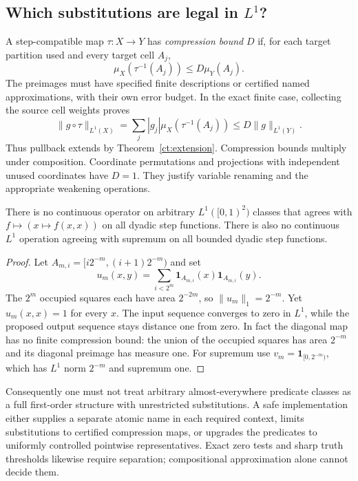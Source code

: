 \subsection{Which substitutions are legal in \texorpdfstring{$L^1$}{L1}?}

A step-compatible map $\tau:X\to Y$ has \emph{compression bound} $D$ if,
for each target partition used and every target cell $A_j$,
\[
                \mu_X(\tau^{-1}(A_j))\leq D\mu_Y(A_j).
\]
The preimages must have specified finite descriptions or certified named
approximations, with their own error budget. In the exact finite case,
collecting the source cell weights proves
\[
 \|g\circ\tau\|_{L^1(X)}
 =\sum_j|g_j|\mu_X(\tau^{-1}(A_j))
 \leq D\|g\|_{L^1(Y)}.
\]
Thus pullback extends by Theorem~\ref{ct:extension}. Compression bounds
multiply under composition. Coordinate permutations and projections with
independent unused coordinates have $D=1$. They justify variable renaming
and the appropriate weakening operations.

\begin{proposition}
\label{ct:diagonal}
There is no continuous operator on arbitrary $L^1([0,1)^2)$ classes that
agrees with $f\mapsto(x\mapsto f(x,x))$ on all dyadic step functions.
There is also no continuous $L^1$ operation agreeing with supremum on all
bounded dyadic step functions.
\end{proposition}
\begin{proof}
Let $A_{m,i}=[i2^{-m},(i+1)2^{-m})$ and set
\[
 u_m(x,y)=\sum_{i<2^m}\mathbf1_{A_{m,i}}(x)
                              \mathbf1_{A_{m,i}}(y).
\]
The $2^m$ occupied squares each have area $2^{-2m}$, so
$\|u_m\|_1=2^{-m}$. Yet $u_m(x,x)=1$ for every $x$.
The input sequence converges to zero in $L^1$, while the proposed output
sequence stays distance one from zero. In fact the diagonal map has no
finite compression bound: the union of the occupied squares has area
$2^{-m}$ and its diagonal preimage has measure one.
For supremum use $v_m=\mathbf1_{[0,2^{-m})}$, which has $L^1$ norm
$2^{-m}$ and supremum one.\end{proof}

Consequently one must not treat arbitrary almost-everywhere predicate
classes as a full first-order structure with unrestricted substitutions.
A safe implementation either supplies a separate atomic name in each
required context, limits substitutions to certified compression maps, or
upgrades the predicates to uniformly controlled pointwise representatives.
Exact zero tests and sharp truth thresholds likewise require separation;
compositional approximation alone cannot decide them.

